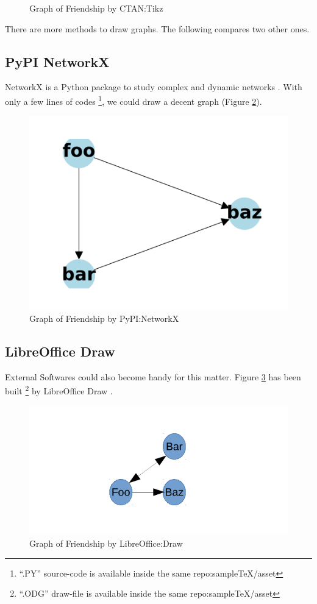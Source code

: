 \documentclass[twocolumn]{article} %
\begin{document}
\begin{figure}[bh!]
\centering
{}
\caption{Graph of Friendship by CTAN:Tikz}
\label{fig:4}
\end{figure}
There are more methods to draw graphs. The following compares two other ones.
\subsection{PyPI NetworkX}
NetworkX is a Python package to study complex and dynamic networks \cite{web:5}.
With only a few lines of codes \footnote{``.PY'' source-code is available inside
the same repo:sampleTeX/asset}, we could draw a decent graph (Figure
\ref{fig:5}).
\begin{figure}[bh!]
\centering
\includegraphics[width=.5\linewidth]{asset/nx_fig1.pdf}
\caption{Graph of Friendship by PyPI:NetworkX}
\label{fig:5}
\end{figure}
\subsection{LibreOffice Draw}
External Softwares could also become handy for this matter. Figure \ref{fig:6}
has been built \footnote{``.ODG'' draw-file is available inside the same
repo:sampleTeX/asset} by LibreOffice Draw \cite{web:6}.
\begin{figure}[bh!]
\centering
\includegraphics[width=.5\linewidth]{asset/draw_fig1.pdf}
\caption{Graph of Friendship by LibreOffice:Draw}
\label{fig:6}
\end{figure}
\end{document}
